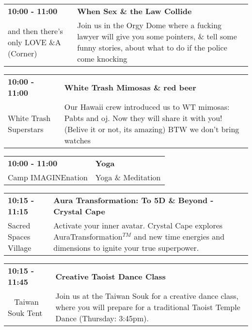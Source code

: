 \begin{tabular}{ p{1in} p{2.2in} }
    \textbf{10:00 - 11:00} & \textbf{When Sex \& the Law Collide} \\
    and then there's only LOVE \newline 4\&A (Corner) & Join us in the Orgy Dome where a fucking lawyer will give you some pointers, \& tell some funny stories, about what to do if the police come knocking \\
    \hline 
\end{tabular}
    
\begin{tabular}{ p{1in} p{2.2in} }
    \textbf{10:00 - 11:00} & \textbf{White Trash Mimosas \& red beer} \\
    White Trash Superstars \newline  & Our Hawaii crew introduced us to WT mimosas: Pabts and oj. Now they will share it with you! (Belive it or not, its amazing) BTW we don't bring watches \\
    \hline 
\end{tabular}
    
\begin{tabular}{ p{1in} p{2.2in} }
    \textbf{10:00 - 11:00} & \textbf{Yoga} \\
    Camp IMAGINEnation \newline  & Yoga \& Meditation \\
    \hline 
\end{tabular}
    
\begin{tabular}{ p{1in} p{2.2in} }
    \textbf{10:15 - 11:15} & \textbf{Aura Transformation: To 5D \& Beyond - Crystal Cape} \\
    Sacred Spaces Village \newline  & Activate your inner avatar. Crystal Cape explores AuraTransformation$^{TM}$ and new time energies and dimensions to ignite your true superpower. \\
    \hline 
\end{tabular}
    
\begin{tabular}{ p{1in} p{2.2in} }
    \textbf{10:15 - 11:45} & \textbf{Creative Taoist Dance Class} \\
    ~ \newline Taiwan Souk Tent & Join us at the Taiwan Souk for a creative dance class, where you will prepare for a traditional Taoist Temple Dance (Thursday: 3:45pm). \\
    \hline 
\end{tabular}
    
